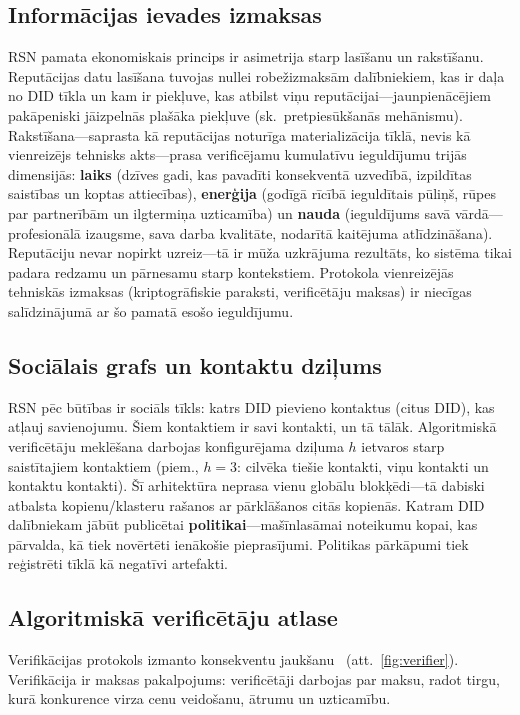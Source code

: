 \documentclass[11pt,a4paper,twocolumn]{article}
\begin{document}
\subsection{Informācijas ievades izmaksas}

RSN pamata ekonomiskais princips ir asimetrija starp lasīšanu un rakstīšanu. Reputācijas datu lasīšana tuvojas nullei robežizmaksām dalībniekiem, kas ir daļa no DID tīkla un kam ir piekļuve, kas atbilst viņu reputācijai---jaunpienācējiem pakāpeniski jāizpelnās plašāka piekļuve (sk.\ pretpiesūkšanās mehānismu). Rakstīšana---saprasta kā reputācijas noturīga materializācija tīklā, nevis kā vienreizējs tehnisks akts---prasa verificējamu kumulatīvu ieguldījumu trijās dimensijās: \textbf{laiks} (dzīves gadi, kas pavadīti konsekventā uzvedībā, izpildītas saistības un koptas attiecības), \textbf{enerģija} (godīgā rīcībā ieguldītais pūliņš, rūpes par partnerībām un ilgtermiņa uzticamība) un \textbf{nauda} (ieguldījums savā vārdā---profesionālā izaugsme, sava darba kvalitāte, nodarītā kaitējuma atlīdzināšana). Reputāciju nevar nopirkt uzreiz---tā ir mūža uzkrājuma rezultāts, ko sistēma tikai padara redzamu un pārnesamu starp kontekstiem. Protokola vienreizējās tehniskās izmaksas (kriptogrāfiskie paraksti, verificētāju maksas) ir niecīgas salīdzinājumā ar šo pamatā esošo ieguldījumu.

\subsection{Sociālais grafs un kontaktu dziļums}

RSN pēc būtības ir sociāls tīkls: katrs DID pievieno kontaktus (citus DID), kas atļauj savienojumu. Šiem kontaktiem ir savi kontakti, un tā tālāk. Algoritmiskā verificētāju meklēšana darbojas konfigurējama dziļuma $h$ ietvaros starp saistītajiem kontaktiem (piem., $h=3$: cilvēka tiešie kontakti, viņu kontakti un kontaktu kontakti). Šī arhitektūra neprasa vienu globālu blokķēdi---tā dabiski atbalsta kopienu/klasteru rašanos ar pārklāšanos citās kopienās. Katram DID dalībniekam jābūt publicētai \textbf{politikai}---mašīnlasāmai noteikumu kopai, kas pārvalda, kā tiek novērtēti ienākošie pieprasījumi. Politikas pārkāpumi tiek reģistrēti tīklā kā negatīvi artefakti.

\subsection{Algoritmiskā verificētāju atlase}

Verifikācijas protokols izmanto konsekventu jaukšanu~\cite{karger1997} (att.~\ref{fig:verifier}). Verifikācija ir maksas pakalpojums: verificētāji darbojas par maksu, radot tirgu, kurā konkurence virza cenu veidošanu, ātrumu un uzticamību.
\end{document}
